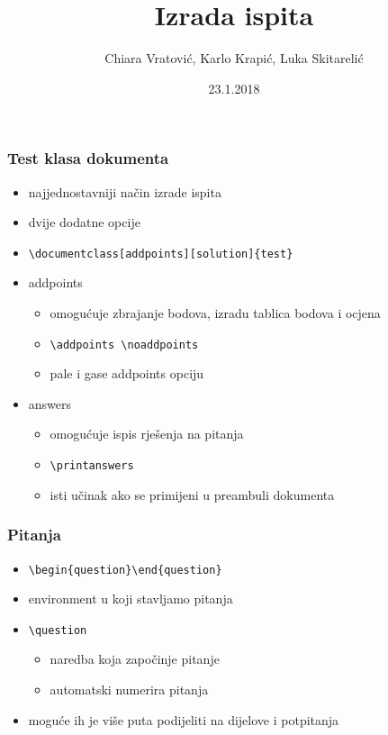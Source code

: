 \documentclass{beamer}
\title{Izrada ispita}
\author{Chiara Vratović, Karlo Krapić, Luka Skitarelić}
\date{23.1.2018}
\institute{Tehnički fakultet}
\begin{document}
	\frame {
		\titlepage 
	}
	\begin{frame}[fragile]
    	\frametitle{Test klasa dokumenta}
    	\begin{itemize} 
    		\item najjednostavniji način izrade ispita
    		\item dvije dodatne opcije
    		\item \begin{verbatim}\documentclass[addpoints][solution]{test}\end{verbatim}
    		\item addpoints
    				\begin{itemize} 
    					\item omogućuje zbrajanje bodova, izradu tablica bodova i ocjena
    					\item \begin{verbatim}\addpoints \noaddpoints\end{verbatim}
    					\item pale i gase addpoints opciju
    				\end{itemize}
    		\item answers 
    				\begin{itemize}
    					\item omogućuje ispis rješenja na pitanja  
    					\item \begin{verbatim}\printanswers\end{verbatim}
    					\item isti učinak ako se primijeni u preambuli dokumenta
    				\end{itemize}
    	\end{itemize}
    \end{frame}
    
    \begin{frame}[fragile]
    	\frametitle{Pitanja}
    	\begin{itemize}
    		\item \begin{verbatim}\begin{question}\end{question}\end{verbatim}
    		\item environment u koji stavljamo pitanja
    		\item \begin{verbatim}\question\end{verbatim}
    		\begin{itemize}
    			\item naredba koja započinje pitanje
    			\item automatski numerira pitanja
    		\end{itemize}
    		\item moguće ih je više puta podijeliti na dijelove i potpitanja 
    	\end{itemize}
    \end{frame}
    
\end{document}
